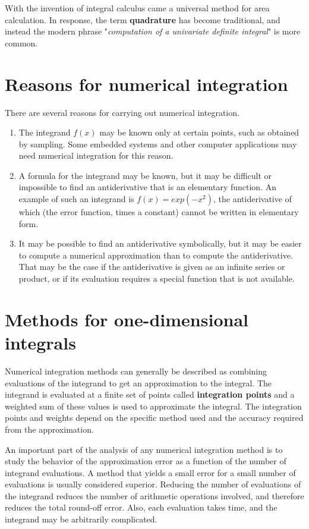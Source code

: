 \documentclass[a4paper]{article}
\begin{document}
With the invention of integral calculus came a universal method for area calculation. In response, the term \textbf{quadrature} has become traditional, and instead the modern phrase "\textit{computation of a univariate definite integral}" is more common.

\section{Reasons for numerical integration}
There are several reasons for carrying out numerical integration.

\begin{enumerate}
\item The integrand $f(x)$ may be known only at certain points, such as obtained by sampling. Some embedded systems and other computer applications may need numerical integration for this reason.
\item A formula for the integrand may be known, but it may be difficult or impossible to find an antiderivative that is an elementary function. An example of such an integrand is $f(x) = exp \left( -x^2 \right)$, the antiderivative of which (the error function, times a constant) cannot be written in elementary form.
\item It may be possible to find an antiderivative symbolically, but it may be easier to compute a numerical approximation than to compute the antiderivative. That may be the case if the antiderivative is given as an infinite series or product, or if its evaluation requires a special function that is not available.
\end{enumerate}

\section{Methods for one-dimensional integrals}
Numerical integration methods can generally be described as combining evaluations of the integrand to get an approximation to the integral. The integrand is evaluated at a finite set of points called \textbf{integration points} and a weighted sum of these values is used to approximate the integral. The integration points and weights depend on the specific method used and the accuracy required from the approximation.

An important part of the analysis of any numerical integration method is to study the behavior of the approximation error as a function of the number of integrand evaluations. A method that yields a small error for a small number of evaluations is usually considered superior. Reducing the number of evaluations of the integrand reduces the number of arithmetic operations involved, and therefore reduces the total round-off error. Also, each evaluation takes time, and the integrand may be arbitrarily complicated.
\end{document}
